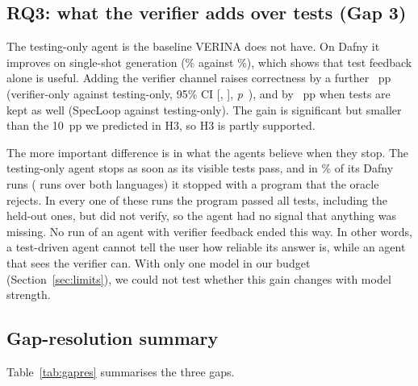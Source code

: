 \subsection{RQ3: what the verifier adds over tests (Gap 3)}
The testing-only agent is the baseline VERINA does not have. On Dafny it improves on single-shot generation (\% against \%), which shows that test feedback alone is useful. Adding the verifier channel raises correctness by a further ~pp (verifier-only against testing-only, 95\% CI [, ], \emph{p}~), and by ~pp when tests are kept as well (SpecLoop against testing-only). The gain is significant but smaller than the 10~pp we predicted in H3, so H3 is partly supported.

The more important difference is in what the agents believe when they stop. The testing-only agent stops as soon as its visible tests pass, and in \% of its Dafny runs ( runs over both languages) it stopped with a program that the oracle rejects. In every one of these runs the program passed all tests, including the held-out ones, but did not verify, so the agent had no signal that anything was missing. No run of an agent with verifier feedback ended this way. In other words, a test-driven agent cannot tell the user how reliable its answer is, while an agent that sees the verifier can. With only one model in our budget (Section~\ref{sec:limits}), we could not test whether this gain changes with model strength.

\subsection{Gap-resolution summary}
Table~\ref{tab:gapres} summarises the three gaps.

